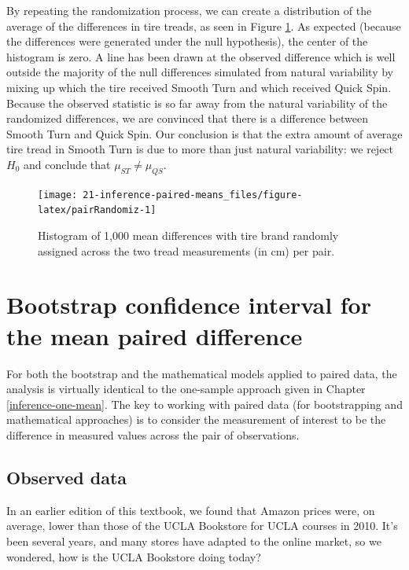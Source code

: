 \documentclass[
  10pt,
  openany]{book}
\begin{document}
By repeating the randomization process, we can create a distribution of the average of the differences in tire treads, as seen in Figure \ref{fig:pairRandomiz}.
As expected (because the differences were generated under the null hypothesis), the center of the histogram is zero.
A line has been drawn at the observed difference which is well outside the majority of the null differences simulated from natural variability by mixing up which the tire received Smooth Turn and which received Quick Spin.
Because the observed statistic is so far away from the natural variability of the randomized differences, we are convinced that there is a difference between Smooth Turn and Quick Spin.
Our conclusion is that the extra amount of average tire tread in Smooth Turn is due to more than just natural variability: we reject \(H_0\) and conclude that \(\mu_{ST} \ne \mu_{QS}.\)

\begin{figure}[h]

{\centering \texttt{[image: 21-inference-paired-means\_files/figure-latex/pairRandomiz-1]} 

}

\caption{Histogram of 1,000 mean differences with tire brand randomly assigned across the two tread measurements (in cm) per pair.}\label{fig:pairRandomiz}
\end{figure}

\hypertarget{bootstrap-confidence-interval-for-the-mean-paired-difference}{%
\section{Bootstrap confidence interval for the mean paired difference}\label{bootstrap-confidence-interval-for-the-mean-paired-difference}}

For both the bootstrap and the mathematical models applied to paired data, the analysis is virtually identical to the one-sample approach given in Chapter \ref{inference-one-mean}.
The key to working with paired data (for bootstrapping and mathematical approaches) is to consider the measurement of interest to be the difference in measured values across the pair of observations.

\hypertarget{observed-data-16}{%
\subsection{Observed data}\label{observed-data-16}}

In an earlier edition of this textbook, we found that Amazon prices were, on average, lower than those of the UCLA Bookstore for UCLA courses in 2010.
It's been several years, and many stores have adapted to the online market, so we wondered, how is the UCLA Bookstore doing today?
\end{document}
